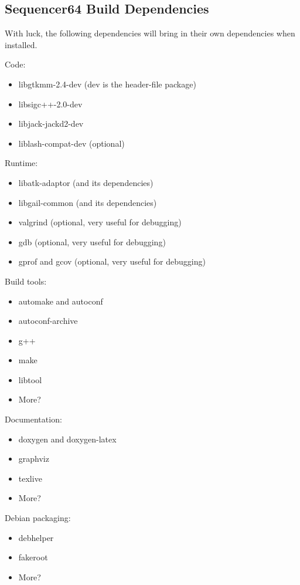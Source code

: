 \subsection{Sequencer64 Build Dependencies}
\label{subsec:seq64_build_dependencies}

   With luck, the following dependencies will bring in their own
   dependencies when installed.

   Code:

     \begin{itemize}
        \item libgtkmm-2.4-dev (dev is the header-file package)
        \item libsigc++-2.0-dev
        \item libjack-jackd2-dev
        \item liblash-compat-dev (optional)
     \end{itemize}

   Runtime:

     \begin{itemize}
        \item libatk-adaptor (and its dependencies)
        \item libgail-common (and its dependencies)
        \item valgrind (optional, very useful for debugging)
        \item gdb (optional, very useful for debugging)
        \item gprof and gcov (optional, very useful for debugging)
     \end{itemize}

   Build tools:

     \begin{itemize}
        \item automake and autoconf
        \item autoconf-archive
        \item g++
        \item make
        \item libtool
        \item More?
     \end{itemize}

   Documentation:

     \begin{itemize}
        \item doxygen and doxygen-latex
        \item graphviz
        \item texlive
        \item More?
     \end{itemize}
      
   Debian packaging:

     \begin{itemize}
        \item debhelper
        \item fakeroot
        \item More?
     \end{itemize}

